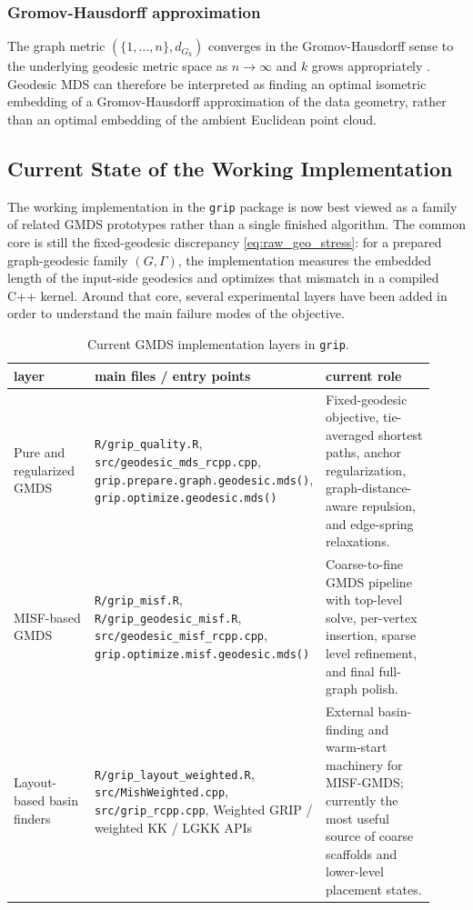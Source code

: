 \documentclass[11pt]{article}
\newcommand{\Gk}{G_k}
\begin{document}
\subsubsection*{Gromov-Hausdorff approximation}
The graph metric $(\{1,\ldots,n\}, d_{\Gk})$ converges in the
Gromov-Hausdorff sense to the underlying geodesic metric space as
$n \to \infty$ and $k$ grows appropriately
\citep{gromov1999metric, latschev2001riemannian, bernstein2000graph}.
Geodesic MDS can therefore be interpreted as finding an optimal isometric
embedding of a Gromov-Hausdorff approximation of the data geometry, rather
than an optimal embedding of the ambient Euclidean point cloud.

\subsection{Current State of the Working Implementation}
\label{sec:current_implementation}

The working implementation in the \texttt{grip} package is now best viewed as
a family of related GMDS prototypes rather than a single finished algorithm.
The common core is still the fixed-geodesic discrepancy
\cref{eq:raw_geo_stress}: for a prepared graph-geodesic family
$(G,\Gamma)$, the implementation measures the embedded length of the
input-side geodesics and optimizes that mismatch in a compiled C++ kernel.
Around that core, several experimental layers have been added in order to
understand the main failure modes of the objective.

\begin{table}[t]
  \centering
  \small
  \caption{Current GMDS implementation layers in \texttt{grip}.}
  \label{tab:implementation_layers}
  \begin{tabular}{p{0.23\linewidth} p{0.34\linewidth} p{0.35\linewidth}}
    \toprule
    layer & main files / entry points & current role \\
    \midrule
    Pure and regularized GMDS &
    \texttt{R/grip\_quality.R},
    \texttt{src/geodesic\_mds\_rcpp.cpp},
    \texttt{grip.prepare.graph.geodesic.mds()},
    \texttt{grip.optimize.geodesic.mds()} &
    Fixed-geodesic objective, tie-averaged shortest paths, anchor regularization, graph-distance-aware repulsion, and edge-spring relaxations. \\
    \addlinespace
    MISF-based GMDS &
    \texttt{R/grip\_misf.R},
    \texttt{R/grip\_geodesic\_misf.R},
    \texttt{src/geodesic\_misf\_rcpp.cpp},
    \texttt{grip.optimize.misf.geodesic.mds()} &
    Coarse-to-fine GMDS pipeline with top-level solve, per-vertex insertion, sparse level refinement, and final full-graph polish. \\
    \addlinespace
    Layout-based basin finders &
    \texttt{R/grip\_layout\_weighted.R},
    \texttt{src/MishWeighted.cpp},
    \texttt{src/grip\_rcpp.cpp},
    Weighted GRIP / weighted KK / LGKK APIs &
    External basin-finding and warm-start machinery for MISF-GMDS; currently the most useful source of coarse scaffolds and lower-level placement states. \\
    \bottomrule
  \end{tabular}
\end{table}
\end{document}
